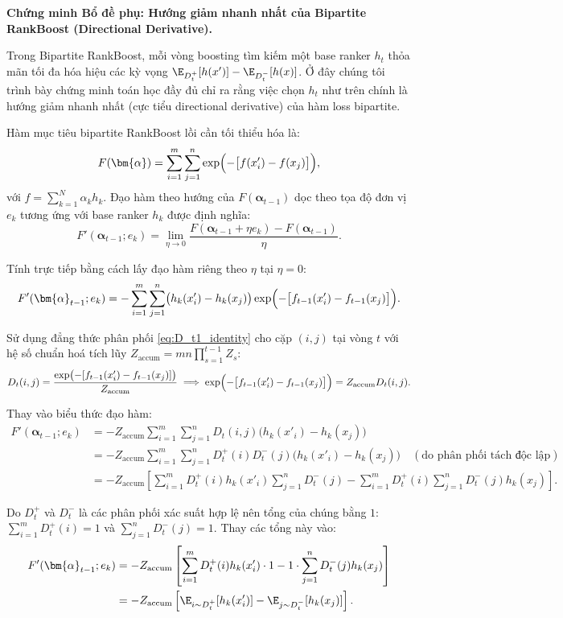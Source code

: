 \begin{extension}
\textbf{Chứng minh Bổ đề phụ: Hướng giảm nhanh nhất của Bipartite RankBoost (Directional Derivative).}

Trong Bipartite RankBoost, mỗi vòng boosting tìm kiếm một base ranker $h_t$ thỏa mãn tối đa hóa hiệu các kỳ vọng $\E_{D^+_t}[h(x')] - \E_{D^-_t}[h(x)]$. Ở đây chúng tôi trình bày chứng minh toán học đầy đủ chỉ ra rằng việc chọn $h_t$ như trên chính là hướng giảm nhanh nhất (cực tiểu directional derivative) của hàm loss bipartite.

Hàm mục tiêu bipartite RankBoost lồi cần tối thiểu hóa là:
\[
    F(\bm{\alpha}) = \sum_{i=1}^m \sum_{j=1}^n \exp\Bigl(-\bigl[f(x'_i) - f(x_j)\bigr]\Bigr),
\]
với $f = \sum_{k=1}^N \alpha_k h_k$. Đạo hàm theo hướng của $F(\bm{\alpha}_{t-1})$ dọc theo tọa độ đơn vị $e_k$ tương ứng với base ranker $h_k$ được định nghĩa:
\[
    F'(\bm{\alpha}_{t-1}; e_k) = \lim_{\eta \to 0} \frac{F(\bm{\alpha}_{t-1} + \eta e_k) - F(\bm{\alpha}_{t-1})}{\eta}.
\]

Tính trực tiếp bằng cách lấy đạo hàm riêng theo $\eta$ tại $\eta = 0$:
\[
    F'(\bm{\alpha}_{t-1}; e_k) = -\sum_{i=1}^m \sum_{j=1}^n \bigl(h_k(x'_i) - h_k(x_j)\bigr) \exp\Bigl(-\bigl[f_{t-1}(x'_i) - f_{t-1}(x_j)\bigr]\Bigr).
\]

Sử dụng đẳng thức phân phối \eqref{eq:D_t1_identity} cho cặp $(i,j)$ tại vòng $t$ với hệ số chuẩn hoá tích lũy $Z_{\text{accum}} = mn \prod_{s=1}^{t-1} Z_s$:
\[
    D_t(i, j) = \frac{\exp\bigl(-[f_{t-1}(x'_i) - f_{t-1}(x_j)]\bigr)}{Z_{\text{accum}}} \implies \exp\Bigl(-\bigl[f_{t-1}(x'_i) - f_{t-1}(x_j)\bigr]\Bigr) = Z_{\text{accum}} D_t(i, j).
\]

Thay vào biểu thức đạo hàm:
\begin{align*}
    F'(\bm{\alpha}_{t-1}; e_k) &= -Z_{\text{accum}} \sum_{i=1}^m \sum_{j=1}^n D_t(i, j) \bigl(h_k(x'_i) - h_k(x_j)\bigr) \\
    &= -Z_{\text{accum}} \sum_{i=1}^m \sum_{j=1}^n D^+_t(i) D^-_t(j) \bigl(h_k(x'_i) - h_k(x_j)\bigr) \quad (\text{do phân phối tách độc lập}) \\
    &= -Z_{\text{accum}} \left[ \sum_{i=1}^m D^+_t(i) h_k(x'_i) \sum_{j=1}^n D^-_t(j) - \sum_{i=1}^m D^+_t(i) \sum_{j=1}^n D^-_t(j) h_k(x_j) \right].
\end{align*}

Do $D^+_t$ và $D^-_t$ là các phân phối xác suất hợp lệ nên tổng của chúng bằng $1$: $\sum_{i=1}^m D^+_t(i) = 1$ và $\sum_{j=1}^n D^-_t(j) = 1$. Thay các tổng này vào:
\begin{align*}
    F'(\bm{\alpha}_{t-1}; e_k) &= -Z_{\text{accum}} \left[ \sum_{i=1}^m D^+_t(i) h_k(x'_i) \cdot 1 - 1 \cdot \sum_{j=1}^n D^-_t(j) h_k(x_j) \right] \\
    &= -Z_{\text{accum}} \left[ \E_{i \sim D^+_t}[h_k(x'_i)] - \E_{j \sim D^-_t}[h_k(x_j)] \right].
\end{align*}


\end{extension}
